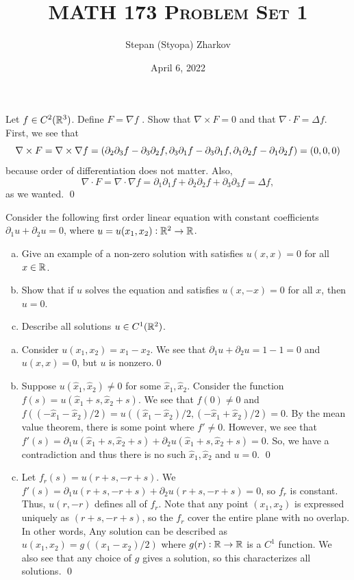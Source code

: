 \documentclass{article}
\title{\textsc{MATH 173 Problem Set 1}}
\author{Stepan (Styopa) Zharkov}
\date{April 6, 2022}
\newcommand{\D}{\nabla}
\renewcommand{\d}{\partial}
\begin{document}
\maketitle
{} Let $f \in C^2(\mathbb{R}^3)$. Define $F = \D f$ . Show that $\D \times F = 0$ and that $\D \cdot F = \Delta f$. \tri
\hop
\solution
First, we see that 
\[\D \times F = \D \times \D f = \del{\d_2\d_3 f - \d_3\d_2 f,\d_3\d_1 f - \d_3\d_1 f, \d_1\d_2 f - \d_1\d_2 f} = (0,0,0)\]
because order of differentiation does not matter. Also, 
\[\D \cdot F = \D \cdot \D f = \d_1\d_1 f +  \d_2\d_2 f  + \d_3\d_3 f  = \Delta f,\]
as we wanted. \qed


\newpage
{}Consider the following first order linear equation with constant coefficients
$\d_1u + \d_2u = 0$, where $u = u(x_1, x_2) : \mathbb{R}^2 \to \mathbb{R}$.
\begin{enumerate}[(a)]
    \item Give an example of a non-zero solution with satisfies $u(x, x) = 0$ for all $x \in \mathbb{R}$.
    \item Show that if $u$ solves the equation and satisfies $u(x, -x) = 0$ for all $x$, then $u = 0$.
    \item Describe all solutions $u \in C^1(\mathbb{R}^2)$.
\end{enumerate}
\tri
\hop
\solution 
\begin{enumerate}[(a)]
    \item Consider $u(x_1, x_2) = x_1 - x_2$. We see that $\d_1u+\d_2u=1-1=0$ and $u(x,x)=0$, but $u$ is nonzero.\qed
    \item Suppose $u(\hat x_1, \hat x_2) \ne 0$ for some $\hat x_1, \hat x_2$. Consider the function $f(s) = u(\hat x_1 + s, \hat x_2 + s)$. We see that $f(0)\ne 0$ and $f((-\hat x_1 -\hat x_2)/2)= u((\hat x_1-\hat x_2)/2, (-\hat x_1+\hat x_2)/2) = 0$. By the mean value theorem, there is some point where $f' \ne 0$. 
    \hop
    However, we see that $f'(s) = \d_1u(\hat x_1+s,\hat x_2+s)+\d_2u(\hat x_1+s, \hat x_2+s) = 0$. So, we have a contradiction and thus there is no such $\hat x_1, \hat x_2$ and $u = 0$. \qed
    \item Let $f_r(s) = u(r+s,-r+s)$. We $f'(s) = \d_1u(r+s,-r+s)+\d_2u(r+s, -r+s) = 0$, so $f_r$ is constant. Thus, $u(r,-r)$ defines all of $f_r$. Note that any point $(x_1, x_2)$ is expressed uniquely as $(r+s, -r+s)$, so the $f_r$ cover the entire plane with no overlap. 
    \hop
    In other words, Any solution can be described as $u(x_1, x_2) = g((x_1-x_2)/2)$ where $g(r): \mathbb{R} \to \mathbb{R}$ is a $C^1$ function. We also see that any choice of $g$ gives a solution, so this characterizes all solutions. \qed
\end{enumerate}
\end{document}
